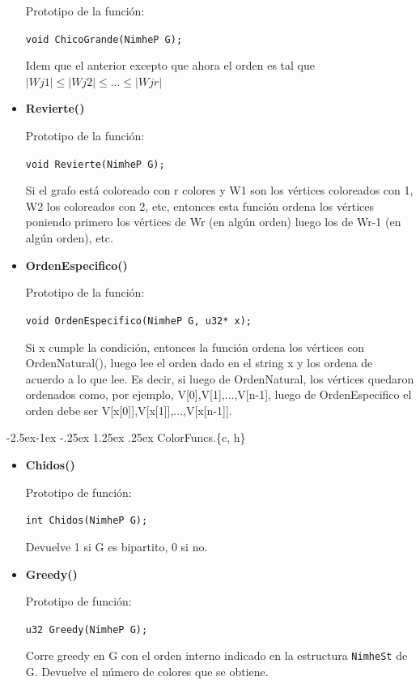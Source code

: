 \documentclass[11pt,a4paper]{article}
\makeatletter
\renewcommand\paragraph{\@startsection{paragraph}{4}{\z@}%
            {-2.5ex\@plus -1ex \@minus -.25ex}%
            {1.25ex \@plus .25ex}%
            {\normalfont\normalsize\bfseries}}
\theoremstyle{plain}
\makeatother
\begin{document}
\begin{itemize}
Prototipo de la función:

\texttt{void ChicoGrande(NimheP G);}

Idem que el anterior excepto que ahora el orden es tal que $|Wj1| \leq |Wj2| \leq ... \leq |Wjr|$

\item{\textbf{{Revierte()}}}

Prototipo de la función:

\texttt{void Revierte(NimheP G);}

Si el grafo está coloreado con r colores y W1 son los vértices coloreados con 1, W2 los coloreados con 2, etc, entonces esta función ordena los vértices poniendo primero los vértices de Wr (en algún orden) luego los de Wr-1 (en algún orden), etc. 

\item{\textbf{{OrdenEspecifico()}}}

Prototipo de la función:

\texttt{void OrdenEspecifico(NimheP G, u32* x);}

Si x cumple la condición, entonces la función ordena los vértices con OrdenNatural(), luego lee el orden dado en el string x y los ordena de acuerdo a lo que lee. Es decir, si luego de OrdenNatural, los vértices quedaron ordenados como, por ejemplo, V[0],V[1],...,V[n-1], luego de OrdenEspecifico el orden debe ser V[x[0]],V[x[1]],...,V[x[n-1]].

\end{itemize}

				\paragraph{ColorFuncs.\{c, h\}}

\begin{itemize}
\item{\textbf{{Chidos()}}}

Prototipo de función:

\texttt{int Chidos(NimheP G);}

Devuelve 1 si G es bipartito, 0 si no.

\item{\textbf{{Greedy()}}}

Prototipo de función:

\texttt{u32 Greedy(NimheP G);}

Corre greedy en G con el orden interno indicado en la estructura \texttt{NimheSt} de G. Devuelve el número de colores que se obtiene.

\end{itemize}
\end{document}
